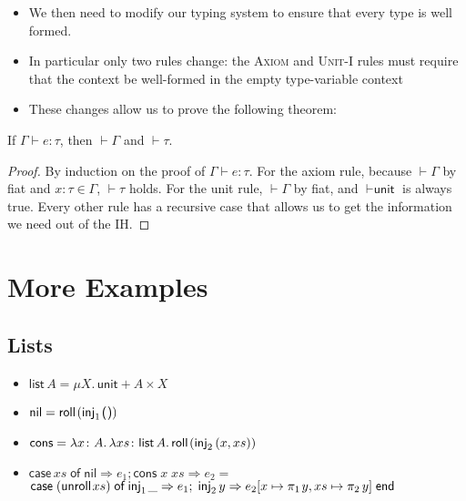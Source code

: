 \documentclass{lecturenotes}
\newcommand{\tabs}[3]{\ensuremath{\lambda #1 \colon #2.\,#3}}
\newcommand{\app}[2]{\ensuremath{#1\;#2}}
\newcommand{\utype}{\textsf{unit}\xspace}
\newcommand{\unit}{\ensuremath{\textsf{(}\mkern0.5mu\textsf{)}}}
\newcommand{\prodtype}[2]{\ensuremath{#1 \times #2}}
\newcommand{\pair}[2]{\ensuremath{(#1, #2)}}
\newcommand{\projl}[1]{\ensuremath{\pi_1\mkern2mu#1}}
\newcommand{\projr}[1]{\ensuremath{\pi_2\mkern3mu#1}}
\newcommand{\sumtype}[2]{\ensuremath{#1 + #2}}
\newcommand{\injl}[1]{\ensuremath{\textsf{inj}_1\mkern2mu#1}}
\newcommand{\injr}[1]{\ensuremath{\textsf{inj}_2\mkern3mu#1}}
\newcommand{\case}[5]{\ensuremath{\textsf{case}\mkern5mu#1\mkern5mu\textsf{of}\mkern5mu\injl{#2} \Rightarrow #3;\mkern5mu\injr{#4} \Rightarrow #5\mkern5mu\textsf{end}}}
\newcommand{\rectype}[2]{\ensuremath{\mu #1.\,#2}}
\newcommand{\roll}[1]{\textsf{roll}\mkern2mu#1}
\newcommand{\unroll}[1]{\textsf{unroll}\mkern2mu#1}
\begin{document}

\begin{itemize}
\item We then need to modify our typing system to ensure that every type is well formed.
\item In particular only two rules change: the \textsc{Axiom} and \textsc{Unit-I} rules must require that the context be well-formed in the empty type-variable context
\end{itemize}


\begin{itemize}
\item These changes allow us to prove the following theorem:
\end{itemize}

\begin{thm}
  If $\Gamma \vdash e : \tau$, then $\vdash \Gamma$ and $\vdash \tau$.
\end{thm}
\begin{proof}
  By induction on the proof of $\Gamma \vdash e : \tau$.
  For the axiom rule, because $\vdash \Gamma$ by fiat and $x : \tau \in \Gamma$, $\vdash \tau$ holds.
  For the unit rule, $\vdash \Gamma$ by fiat, and $\vdash \utype$ is always true.
  Every other rule has a recursive case that allows us to get the information we need out of the IH.
\end{proof}

\section{More Examples}
\label{sec:more-examples}

\subsection{Lists}
\label{sec:lists}

\begin{itemize}
\item $\textsf{list}\,A = \rectype{X}{\sumtype{\utype}{\prodtype{A}{X}}}$
\item $\textsf{nil} = \roll{(\injl{\unit})}$
\item $\textsf{cons} = \tabs{x}{A}{\tabs{xs}{\textsf{list}\,A}{\roll{(\injr{\pair{x}{xs}})}}}$
\item $\textsf{case}\,xs \mathrel{\textsf{of}} \textsf{nil} \Rightarrow e_1; \app{\app{\textsf{cons}}{x}}{xs} \Rightarrow e_2 =$\\
  $\case{(\unroll{xs})}{\_}{e_1}{y}{e_2[x \mapsto \projl{y}, xs \mapsto \projr{y}]}$
\end{itemize}
\end{document}

